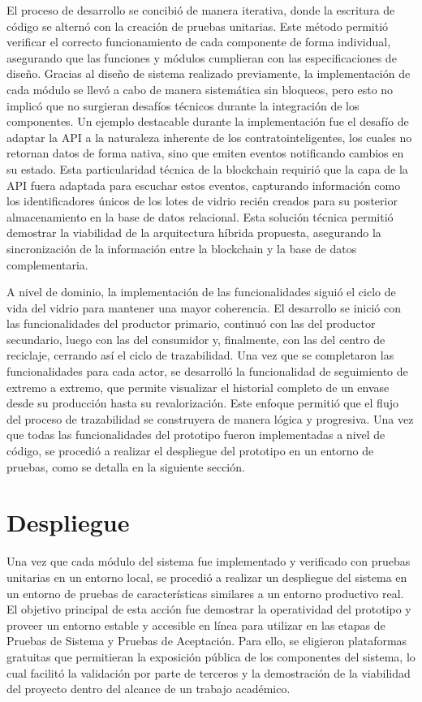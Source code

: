 El proceso de desarrollo se concibió de manera iterativa, donde la escritura de código se alternó con la creación de pruebas unitarias. Este método permitió verificar el correcto funcionamiento de cada componente de forma individual, asegurando que las funciones y módulos cumplieran con las especificaciones de diseño. Gracias al diseño de sistema realizado previamente, la implementación de cada módulo se llevó a cabo de manera sistemática sin bloqueos, pero esto no implicó que no surgieran desafíos técnicos durante la integración de los componentes. Un ejemplo destacable durante la implementación fue el desafío de adaptar la API a la naturaleza inherente de los \glspl{contratointeligente}, los cuales no retornan datos de forma nativa, sino que emiten eventos notificando cambios en su estado. Esta particularidad técnica de la blockchain requirió que la capa de la API fuera adaptada para escuchar estos eventos, capturando información como los identificadores únicos de los lotes de vidrio recién creados para su posterior almacenamiento en la base de datos relacional. Esta solución técnica permitió demostrar la viabilidad de la arquitectura híbrida propuesta, asegurando la sincronización de la información entre la blockchain y la base de datos complementaria. 

A nivel de dominio, la implementación de las funcionalidades siguió el ciclo de vida del vidrio para mantener una mayor coherencia. El desarrollo se inició con las funcionalidades del productor primario, continuó con las del productor secundario, luego con las del consumidor y, finalmente, con las del centro de reciclaje, cerrando así el ciclo de \gls{trazabilidad}. Una vez que se completaron las funcionalidades para cada actor, se desarrolló la funcionalidad de seguimiento de extremo a extremo, que permite visualizar el historial completo de un envase desde su producción hasta su revalorización. Este enfoque permitió que el flujo del proceso de trazabilidad se construyera de manera lógica y progresiva. Una vez que todas las funcionalidades del prototipo fueron implementadas a nivel de código, se procedió a realizar el despliegue del prototipo en un entorno de pruebas, como se detalla en la siguiente sección.

\section{Despliegue}
\label{sec:deployment}

Una vez que cada módulo del sistema fue implementado y verificado con pruebas unitarias en un entorno local, se procedió a realizar un despliegue del sistema en un entorno de pruebas de características similares a un entorno productivo real. El objetivo principal de esta acción fue demostrar la operatividad del prototipo y proveer un entorno estable y accesible en línea para utilizar en las etapas de Pruebas de Sistema y Pruebas de Aceptación. Para ello, se eligieron plataformas gratuitas que permitieran la exposición pública de los componentes del sistema, lo cual facilitó la validación por parte de terceros y la demostración de la viabilidad del proyecto dentro del alcance de un trabajo académico.

